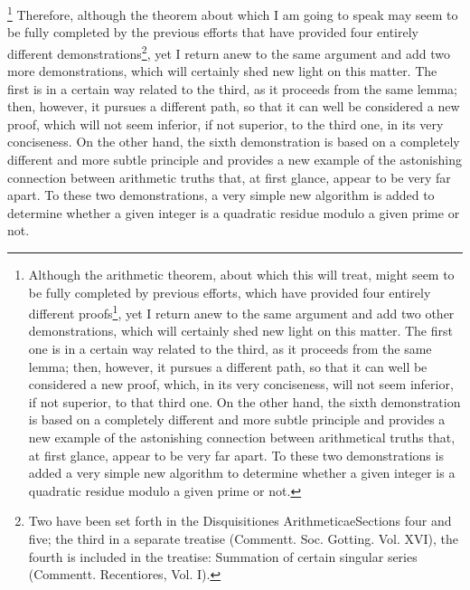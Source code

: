 \documentclass[twoside,12pt, showframe]{memoir}
\begin{document}
\footnote{Although the arithmetic theorem, about which this will treat, might seem to be fully completed by previous efforts, which have provided four entirely different proofs\footnote{Two have been set forth in the Disquisitiones Arithmeticae Sections four and five; the third in a separate treatise (Commentt. Soc. Gotting. Vol. XVI), the fourth is included in the treatise: Summation of certain singular series (Commentt. Recentiores, Vol. I).}, yet I return anew to the same argument and add two other demonstrations, which will certainly shed new light on this matter. The first one is in a certain way related to the third, as it proceeds from the same lemma; then, however, it pursues a different path, so that it can well be considered a new proof, which, in its very conciseness, will not seem inferior, if not superior, to that third one. On the other hand, the sixth demonstration is based on a completely different and more subtle principle and provides a new example of the astonishing connection between arithmetical truths that, at first glance, appear to be very far apart. To these two demonstrations is added a very simple new algorithm to determine whether a given integer is a quadratic residue modulo a given prime or not.}
Therefore, although the theorem about which I am going to speak may seem to be fully completed by the previous efforts that have provided four entirely different demonstrations\footnote{Two have been set forth in the Disquisitiones Arithmeticae\enspace Sections four and five; the third in a separate treatise (Commentt. Soc. Gotting. Vol. XVI), the fourth is included in the treatise: Summation of certain singular series (Commentt. Recentiores, Vol. I).}, yet I return anew to the same argument and add two more demonstrations, which will certainly shed new light on this matter. The first is in a certain way related to the third, as it proceeds from the same lemma; then, however, it pursues a different path, so that it can well be considered a new proof, which will not seem inferior, if not superior, to the third one, in its very conciseness. On the other hand, the sixth demonstration is based on a completely different and more subtle principle and provides a new example of the astonishing connection between arithmetic truths that, at first glance, appear to be very far apart. To these two demonstrations, a very simple new algorithm is added to determine whether a given integer is a quadratic residue modulo a given prime or not.
%
\end{document}

